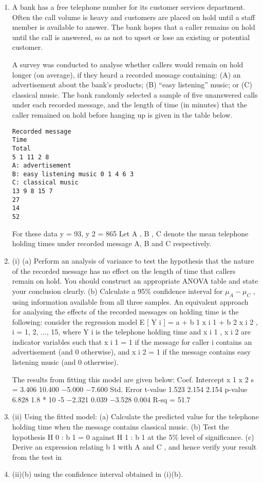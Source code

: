 \documentclass[a4paper,12pt]{article}
\begin{document}
\begin{enumerate}

\item A bank has a free telephone number for its customer services department. Often the call volume is heavy and customers are placed on hold until a staff member is available to answer. The bank hopes that a caller remains on hold until the call is
answered, so as not to upset or lose an existing or potential customer.

A survey was conducted to analyse whether callers would remain on hold longer (on average), if they heard a recorded message containing: (A) an advertisement about the bank’s products; (B) “easy listening” music; or (C) classical music. The bank
randomly selected a sample of five unanswered calls under each recorded message, and the length of time (in minutes) that the caller remained on hold before hanging up is given in the table below.
\begin{verbatim}
Recorded message
Time
Total
5 1 11 2 8
A: advertisement
B: easy listening music 0 1 4 6 3
C: classical music
13 9 8 15 7
27
14
52
\end{verbatim}
For these data \sigma y = 93, \sigma y 2 = 865
Let \mu  A , \mu  B , \mu  C denote the mean telephone holding times under recorded message A, B and C respectively.
\item (i)
(a) Perform an analysis of variance to test the hypothesis that the nature of the recorded message has no effect on the length of time that callers remain on hold. You should construct an appropriate ANOVA table and state your conclusion clearly.
(b) Calculate a 95\% confidence interval for $\mu_A − \mu_C$ , using information available from all three samples.
An equivalent approach for analysing the effects of the recorded messages on holding
time is the following:
consider the regression model E [ Y i ] = a + b 1 x i 1 + b 2 x i 2 , i = 1, 2, ..., 15, where Y i is the telephone holding time and x i 1 , x i 2 are indicator variables such that x i 1 = 1 if the message for caller i contains an advertisement (and 0 otherwise), and x i 2 = 1 if the message contains easy listening music (and 0 otherwise).

The results from fitting this model are given below:
Coef.
Intercept
x 1
x 2
s = 3.406
10.400
−5.000
−7.600
Std. Error t-value
1.523
2.154
2.154
p-value
6.828 1.8 * 10 -5
−2.321
0.039
−3.528
0.004
R-sq = 51.7%
\item (ii)
Using the fitted model:
(a) Calculate the predicted value for the telephone holding time when the message contains classical music.
(b) Test the hypothesis H 0 : b 1 = 0 against H 1 : b 1  at the 5\% level of significance.
(c) Derive an expression relating b 1 with \mu  A and \mu  C , and hence verify your result from the test in \item (ii)(b) using the confidence interval
obtained in (i)(b).

\end{enumerate}
\end{document}
